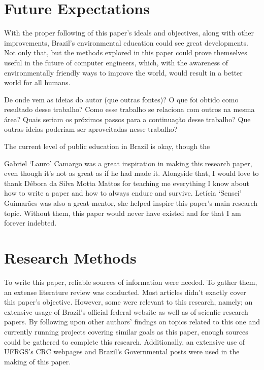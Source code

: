 \documentclass[sigconf, authorversion, nonacm]{acmart}
\begin{document}
\section{Future Expectations}
  With the proper following of this paper's ideals and objectives, along with other improvements, Brazil's environmental education could see great developments. Not only that, but the methods explored in this paper could prove themselves useful in the future of computer engineers, which, with the awareness of environmentally friendly ways to improve the world, would result in a better world for all humans.

De onde vem as ideias do autor (que outras fontes)?
O que foi obtido como resultado desse trabalho?
Como esse trabalho se relaciona com outros na mesma área?
Quais seriam os próximos passos para a continuação desse trabalho?
Que outras ideias poderiam ser aproveitadas nesse trabalho?

The current level of public education in Brazil is okay, though the

\begin{acks}
Gabriel ‘Lauro’ Camargo was a great inspiration in making this research paper, even though it’s not as great as if he had made it. Alongside that, I would love to thank Débora da Silva Motta Mattos for teaching me everything I know about how to write a paper and how to always endure and survive. Letícia ‘Sensei’ Guimarães was also a great mentor, she helped inspire this paper’s main research topic. Without them, this paper would never have existed and for that I am forever indebted.
\end{acks}





\appendix

\section{Research Methods}

To write this paper, reliable sources of information were needed. To gather them, an extense literature review was conducted. Most articles didn’t exactly cover this paper’s objective. However, some were relevant to this research, namely; an extensive usage of Brazil’s official federal website as well as of scienfic research papers. By following upon other authors’ findngs on topics related to this one and currently running projects covering similar goals as this paper, enough sources could be gathered to complete this research. Additionally, an extensive use of UFRGS's CRC webpages and Brazil's Governmental posts were used in the making of this paper.
\end{document}
